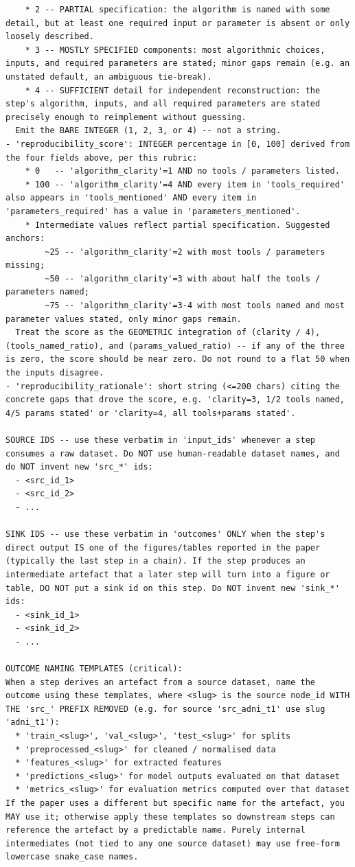\documentclass{article}
\begin{document}
\begin{lstlisting}
    * 2 -- PARTIAL specification: the algorithm is named with some detail, but at least one required input or parameter is absent or only loosely described.
    * 3 -- MOSTLY SPECIFIED components: most algorithmic choices, inputs, and required parameters are stated; minor gaps remain (e.g. an unstated default, an ambiguous tie-break).
    * 4 -- SUFFICIENT detail for independent reconstruction: the step's algorithm, inputs, and all required parameters are stated precisely enough to reimplement without guessing.
  Emit the BARE INTEGER (1, 2, 3, or 4) -- not a string.
- 'reproducibility_score': INTEGER percentage in [0, 100] derived from the four fields above, per this rubric:
    * 0   -- 'algorithm_clarity'=1 AND no tools / parameters listed.
    * 100 -- 'algorithm_clarity'=4 AND every item in 'tools_required' also appears in 'tools_mentioned' AND every item in 'parameters_required' has a value in 'parameters_mentioned'.
    * Intermediate values reflect partial specification. Suggested anchors:
        ~25 -- 'algorithm_clarity'=2 with most tools / parameters missing;
        ~50 -- 'algorithm_clarity'=3 with about half the tools / parameters named;
        ~75 -- 'algorithm_clarity'=3-4 with most tools named and most parameter values stated, only minor gaps remain.
  Treat the score as the GEOMETRIC integration of (clarity / 4), (tools_named_ratio), and (params_valued_ratio) -- if any of the three is zero, the score should be near zero. Do not round to a flat 50 when the inputs disagree.
- 'reproducibility_rationale': short string (<=200 chars) citing the concrete gaps that drove the score, e.g. 'clarity=3, 1/2 tools named, 4/5 params stated' or 'clarity=4, all tools+params stated'.

SOURCE IDS -- use these verbatim in 'input_ids' whenever a step consumes a raw dataset. Do NOT use human-readable dataset names, and do NOT invent new 'src_*' ids:
  - <src_id_1>
  - <src_id_2>
  - ...

SINK IDS -- use these verbatim in 'outcomes' ONLY when the step's direct output IS one of the figures/tables reported in the paper (typically the last step in a chain). If the step produces an intermediate artefact that a later step will turn into a figure or table, DO NOT put a sink id on this step. Do NOT invent new 'sink_*' ids:
  - <sink_id_1>
  - <sink_id_2>
  - ...

OUTCOME NAMING TEMPLATES (critical):
When a step derives an artefact from a source dataset, name the outcome using these templates, where <slug> is the source node_id WITH THE 'src_' PREFIX REMOVED (e.g. for source 'src_adni_t1' use slug 'adni_t1'):
  * 'train_<slug>', 'val_<slug>', 'test_<slug>' for splits
  * 'preprocessed_<slug>' for cleaned / normalised data
  * 'features_<slug>' for extracted features
  * 'predictions_<slug>' for model outputs evaluated on that dataset
  * 'metrics_<slug>' for evaluation metrics computed over that dataset
If the paper uses a different but specific name for the artefact, you MAY use it; otherwise apply these templates so downstream steps can reference the artefact by a predictable name. Purely internal intermediates (not tied to any one source dataset) may use free-form lowercase snake_case names.


\end{lstlisting}
\end{document}
